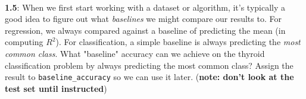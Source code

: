 \documentclass[11pt]{article}
\begin{document}
    \begin{center}
    \end{center}
    { \hspace*{\fill} \\}
    
    \textbf{1.5}: When we first start working with a dataset or algorithm,
it's typically a good idea to figure out what \emph{baselines} we might
compare our results to. For regression, we always compared against a
baseline of predicting the mean (in computing \(R^2\)). For
classification, a simple baseline is always predicting the \emph{most
common class}. What "baseline" accuracy can we achieve on the thyroid
classification problem by always predicting the most common class?
Assign the result to \texttt{baseline\_accuracy} so we can use it later.
(\textbf{note: don't look at the test set until instructed})
\end{document}
